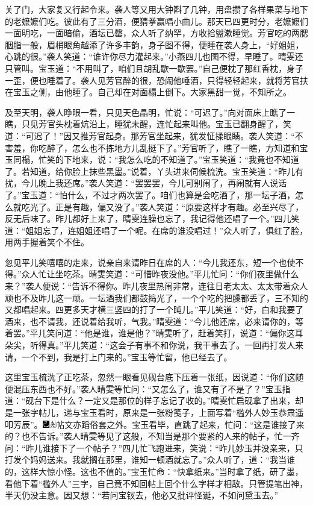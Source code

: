 关了门，大家复又行起令来。袭人等又用大钟斟了几钟，用盘攒了各样果菜与地下的老嬷嬷们吃。彼此有了三分酒，便猜拳赢唱小曲儿。那天已四更时分，老嬷嬷们一面明吃，一面暗偷，酒坛已罄，众人听了纳罕，方收拾盥漱睡觉。芳官吃的两腮胭脂一般，眉梢眼角越添了许多丰韵，身子图不得，便睡在袭人身上，“好姐姐，心跳的很。”袭人笑道：“谁许你尽力灌起来。”小燕四儿也图不得，早睡了。晴雯还只管叫。宝玉道：“不用叫了，咱们且胡乱歇一歇罢。”自己便枕了那红香枕，身子一歪，便也睡着了。袭人见芳官醉的很，恐闹他唾酒，只得轻轻起来，就将芳官扶在宝玉之侧，由他睡了。自己却在对面榻上倒下。大家黑甜一觉，不知所之。

及至天明，袭人睁眼一看，只见天色晶明，忙说：“可迟了。”向对面床上瞧了一瞧，只见芳官头枕着炕沿上，睡犹未醒，连忙起来叫他。宝玉已翻身醒了，笑道：“可迟了！”因又推芳官起身。那芳官坐起来，犹发怔揉眼睛。袭人笑道：“不害羞，你吃醉了，怎么也不拣地方儿乱挺下了。”芳官听了，瞧了一瞧，方知道和宝玉同榻，忙笑的下地来，说：“我怎么吃的不知道了。”宝玉笑道：“我竟也不知道了。若知道，给你脸上抹些黑墨。”说着，丫头进来伺候梳洗。宝玉笑道：“昨儿有扰，今儿晚上我还席。”袭人笑道：“罢罢罢，今儿可别闹了，再闹就有人说话了。”宝玉道：“怕什么，不过才两次罢了。咱们也算是会吃酒了，那一坛子酒，怎么就吃光了。正是有趣，偏又没了。”袭人笑道：“原要这样才有趣。必至兴尽了，反无后味了。昨儿都好上来了，晴雯连臊也忘了，我记得他还唱了一个。”四儿笑道：“姐姐忘了，连姐姐还唱了一个呢。在席的谁没唱过！”众人听了，俱红了脸，用两手握着笑个不住。

忽见平儿笑嘻嘻的走来，说亲自来请昨日在席的人：“今儿我还东，短一个也使不得。”众人忙让坐吃茶。晴雯笑道：“可惜昨夜没他。”平儿忙问：“你们夜里做什么来？”袭人便说：“告诉不得你。昨儿夜里热闹非常，连往日老太太、太太带着众人顽也不及昨儿这一顽。一坛酒我们都鼓捣光了，一个个吃的把臊都丢了，三不知的又都唱起来。四更多天才横三竖四的打了一个盹儿。”平儿笑道：“好，白和我要了酒来，也不请我，还说着给我听，气我。”晴雯道：“今儿他还席，必来请你的，等着罢。”平儿笑问道：“他是谁，谁是他？”晴雯听了，赶着笑打，说道：“偏你这耳朵尖，听得真。”平儿笑道：“这会子有事不和你说，我干事去了。一回再打发人来请，一个不到，我是打上门来的。”宝玉等忙留，他已经去了。

这里宝玉梳洗了正吃茶，忽然一眼看见砚台底下压着一张纸，因说道：“你们这随便混压东西也不好。”袭人晴雯等忙问：“又怎么了，谁又有了不是了？”宝玉指道：“砚台下是什么？一定又是那位的样子忘记了收的。”晴雯忙启砚拿了出来，却是一张字帖儿，递与宝玉看时，原来是一张粉笺子，上面写着“槛外人妙玉恭肃遥叩芳辰”。{\includegraphics[width=3mm]{../Images/00003}\includegraphics[width=3mm]{../Images/00012}\footnotesize \kaishu 帖文亦蹈俗套之外。}宝玉看毕，直跳了起来，忙问：“这是谁接了来的？也不告诉。”袭人晴雯等见了这般，不知当是那个要紧的人来的帖子，忙一齐问：“昨儿谁接下了一个帖子？”四儿忙飞跑进来，笑说：“昨儿妙玉并没亲来，只打发个妈妈送来。我就搁在那里，谁知一顿酒就忘了。”众人听了，道：“我当谁的，这样大惊小怪。这也不值的。”宝玉忙命：“快拿纸来。”当时拿了纸，研了墨，看他下着“槛外人”三字，自己竟不知回帖上回个什么字样才相敌。只管提笔出神，半天仍没主意。因又想：“若问宝钗去，他必又批评怪诞，不如问黛玉去。”

